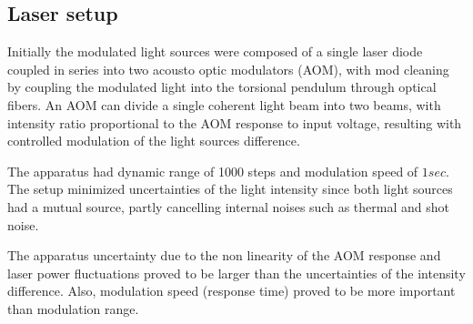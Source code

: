 \documentclass[\main/master.tex]{subfiles}
\begin{document}
\subsection{Laser setup}
Initially the modulated light sources were composed of a single laser diode coupled in series into two acousto optic modulators (AOM), with mod cleaning by coupling the modulated light into the torsional pendulum through optical fibers. An AOM can divide a single coherent light beam into two beams, with intensity ratio proportional to the AOM response to input voltage, resulting with controlled modulation of the light sources difference.
\par\noindent
The apparatus had dynamic range of 1000 steps and modulation speed of $1 sec$. The setup minimized uncertainties of the light intensity since both light sources had a mutual source, partly cancelling internal noises such as thermal and shot noise. 
\par\noindent
The apparatus uncertainty due to the non linearity of the AOM response and laser power fluctuations proved to be larger than the uncertainties of the intensity difference. Also, modulation speed (response time) proved to be more important than modulation range. 
\end{document}
